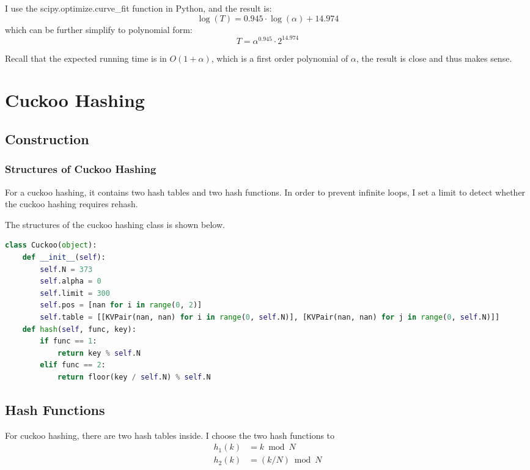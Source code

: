 \documentclass{article}
\begin{document}
\begin{spacing}{1.2}
\begin{itemize}
    I use the scipy.optimize.curve\_fit function in Python, and the result is:
    \begin{equation*}
        \log(T) = 0.945 \cdot \log(\alpha) + 14.974
    \end{equation*}
    which can be further simplify to polynomial form:
    \begin{equation*}
        T = \alpha^{0.945}\cdot 2^{14.974}
    \end{equation*}

    Recall that the expected running time is in $O(1+\alpha)$, which is a first order polynomial of $\alpha$, the result is close and thus makes sense.
\end{itemize}

\section{Cuckoo Hashing}
\subsection{Construction}
\subsubsection{Structures of Cuckoo Hashing}
For a cuckoo hashing, it contains two hash tables and two hash functions. In order to prevent infinite loops, I set a limit to detect whether the cuckoo hashing requires rehash.

The structures of the cuckoo hashing class is shown below.
\begin{lstlisting}[language=Python]
class Cuckoo(object):
    def __init__(self):
        self.N = 373
        self.alpha = 0
        self.limit = 300
        self.pos = [nan for i in range(0, 2)]
        self.table = [[KVPair(nan, nan) for i in range(0, self.N)], [KVPair(nan, nan) for j in range(0, self.N)]]
    def hash(self, func, key):
        if func == 1:
            return key % self.N
        elif func == 2:
            return floor(key / self.N) % self.N
\end{lstlisting}

\subsection{Hash Functions}
For cuckoo hashing, there are two hash tables inside. I choose the two hash functions to
\begin{align*}
    h_1(k) &= k\bmod N\\
    h_2(k) &= (k / N) \bmod N
\end{align*}


\end{spacing}
\end{document}
